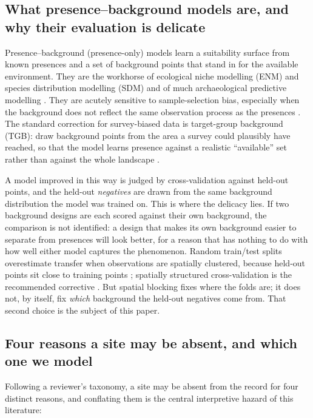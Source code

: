 \documentclass[12pt]{article}
\begin{document}
\subsection{What presence--background models are, and why their evaluation is delicate}

Presence--background (presence-only) models learn a suitability surface from known presences and a set of background points that stand in for the available environment.
They are the workhorse of ecological niche modelling (ENM) and species distribution modelling (SDM) \citep{elith2006, phillips2006} and of much archaeological predictive modelling \citep{verhagen2012, kvamme2006}.
They are acutely sensitive to sample-selection bias, especially when the background does not reflect the same observation process as the presences \citep{phillips2009, araujo2006, wisz2009, lobo2010}.
The standard correction for survey-biased data is target-group background (TGB): draw background points from the area a survey could plausibly have reached, so that the model learns presence against a realistic ``available'' set rather than against the whole landscape \citep{phillips2009}.

A model improved in this way is judged by cross-validation against held-out points, and the held-out \emph{negatives} are drawn from the same background distribution the model was trained on.
This is where the delicacy lies.
If two background designs are each scored against their own background, the comparison is not identified: a design that makes its own background easier to separate from presences will look better, for a reason that has nothing to do with how well either model captures the phenomenon.
Random train/test splits overestimate transfer when observations are spatially clustered, because held-out points sit close to training points \citep{hijmans2012, roberts2017}; spatially structured cross-validation is the recommended corrective \citep{valavi2019}.
But spatial blocking fixes where the folds are; it does not, by itself, fix \emph{which} background the held-out negatives come from.
That second choice is the subject of this paper.

\subsection{Four reasons a site may be absent, and which one we model}

\label{sec:taxonomy}

Following a reviewer's taxonomy, a site may be absent from the record for four distinct reasons, and conflating them is the central interpretive hazard of this literature:
\end{document}
